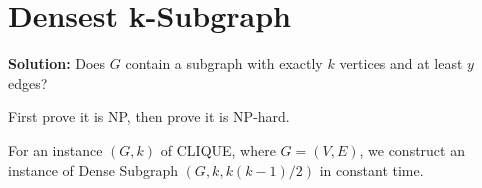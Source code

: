 
\section{Densest k-Subgraph}

{\bf Solution:} Does $G$ contain a subgraph with exactly $k$ vertices and at least $y$ edges?

First prove it is NP, then prove it is NP-hard.

For an instance $(G, k)$ of  CLIQUE, where $G=(V, E)$, we construct an instance of Dense Subgraph $(G, k, k(k-1)/2)$ in constant time.